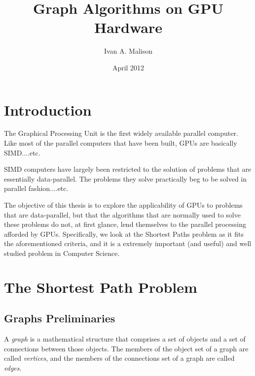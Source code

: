 \documentclass[12pt,twoside]{reedthesis}
\title{Graph Algorithms on GPU Hardware}
\author{Ivan A. Malison}
\date{April 2012}
\newcommand{\im}[1]{{\em#1}}
\begin{document}
\maketitle
\frontmatter 
\pagestyle{empty}


  


\tableofcontents


\mainmatter 
\pagestyle{fancyplain}
\chapter*{Introduction}

The Graphical Processing Unit is the first widely available parallel computer. Like most of the parallel computers that have been built, GPUs are basically SIMD....etc.

SIMD computers have largely been restricted to the solution of problems that are essentially data-parallel. The problems they solve practically beg to be solved in parallel fashion....etc.

The objective of this thesis is to explore the applicability of GPUs to problems that are data-parallel, but that the algorithms that are normally used to solve these problems do not, at first glance, lend themselves to the parallel processing afforded by GPUs. Specifically, we look at the Shortest Paths problem as it fits the aforementioned criteria, and it is a extremely important (and useful) and well studied problem in Computer Science.

\chapter{The Shortest Path Problem}



\section{Graphs Preliminaries}

A \im{graph} is a mathematical structure that comprises a set of objects and a set of connections between those objects. The members of the object set of a graph are called \im{vertices}, and the members of the connections set of a graph are called \im{edges}.
\end{document}
